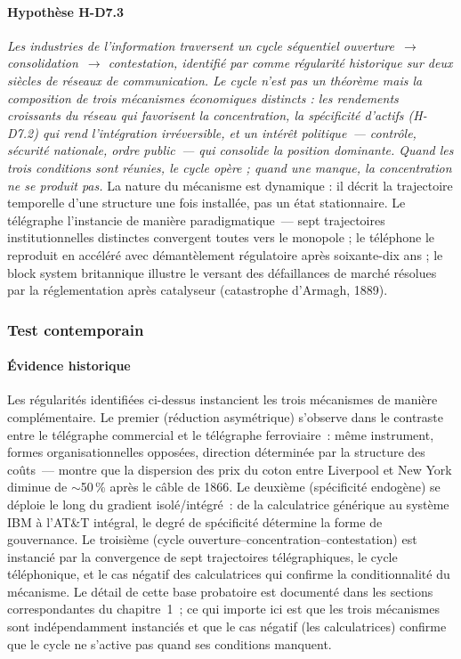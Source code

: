 \paragraph{Hypothèse H-D7.3} \emph{Les industries de l'information traversent un cycle séquentiel ouverture~$\to$ consolidation~$\to$ contestation, identifié par \textcite{wu2010master} comme régularité historique sur deux siècles de réseaux de communication. Le cycle n'est pas un théorème mais la composition de trois mécanismes économiques distincts : les rendements croissants du réseau \parencite{katz_network_1985} qui favorisent la concentration, la spécificité d'actifs (H-D7.2) qui rend l'intégration irréversible, et un intérêt politique~--- contrôle, sécurité nationale, ordre public~--- qui consolide la position dominante. Quand les trois conditions sont réunies, le cycle opère ; quand une manque, la concentration ne se produit pas.} La nature du mécanisme est dynamique : il décrit la trajectoire temporelle d'une structure une fois installée, pas un état stationnaire. Le télégraphe l'instancie de manière paradigmatique~--- sept trajectoires institutionnelles distinctes convergent toutes vers le monopole ; le téléphone le reproduit en accéléré avec démantèlement régulatoire après soixante-dix ans ; le block system britannique illustre le versant des défaillances de marché résolues par la réglementation après catalyseur (catastrophe d'Armagh, 1889).


\subsubsection{Test contemporain}

\paragraph{Évidence historique}

Les régularités identifiées ci-dessus instancient les trois mécanismes de manière complémentaire. Le premier (réduction asymétrique) s'observe dans le contraste entre le télégraphe commercial et le télégraphe ferroviaire~: même instrument, formes organisationnelles opposées, direction déterminée par la structure des coûts~--- \textcite{steinwender_real_2018} montre que la dispersion des prix du coton entre Liverpool et New York diminue de $\sim$50\,\% après le câble de 1866. Le deuxième (spécificité endogène) se déploie le long du gradient isolé/intégré~: de la calculatrice générique au système IBM à l'AT\&T intégral, le degré de spécificité détermine la forme de gouvernance. Le troisième (cycle ouverture--concentration--contestation) est instancié par la convergence de sept trajectoires télégraphiques, le cycle téléphonique, et le cas négatif des calculatrices qui confirme la conditionnalité du mécanisme. Le détail de cette base probatoire est documenté dans les sections correspondantes du chapitre~1~; ce qui importe ici est que les trois mécanismes sont indépendamment instanciés et que le cas négatif (les calculatrices) confirme que le cycle ne s'active pas quand ses conditions manquent.


